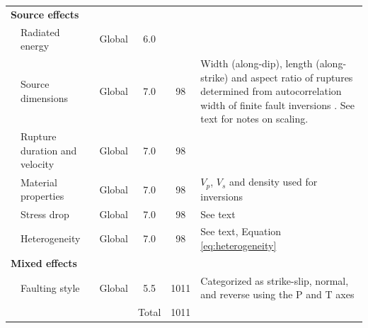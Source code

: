 \documentclass[draft, jgrga]{agujournal2018}
\begin{document}
\begin{table}[]
\begin{threeparttable}
\begin{tabular}{@{}lp{2cm}p{1cm}ccp{6.5cm}@{}}
\multicolumn{2}{l}{\textbf{Source effects}} &              &       &      &                                                                                                                                                                                                            \\
          & Radiated energy\tnote{5}        & Global       & 6.0   &      &                                                                                                                                                                                                            \\
          & Source dimensions\tnote{6}      & Global       & 7.0   & 98   & Width (along-dip), length (along-strike) and aspect ratio of ruptures determined from autocorrelation width of finite fault inversions \citep[following][]{mai2000}. See text for notes on scaling.                                 \\
          & Rupture duration and velocity\tnote{7}& Global  & 7.0   & 98   &                                                                                                                                                                                                            \\
          & Material properties\tnote{7}    & Global       & 7.0   & 98   & $V_p$, $V_s$ and density used for inversions                                                                                                                                                         \\   
          & Stress drop\tnote{6}            & Global       & 7.0   & 98   & See text                                                                                                                                                                                                  \\
          & Heterogeneity\tnote{6}          & Global       & 7.0   & 98   & See text, Equation \ref{eq:heterogeneity}                                                                                                                                                                                                   \\
\multicolumn{2}{l}{\textbf{Mixed effects}}  &              &       &      &                                                                                                                                                                                                            \\
          & Faulting style\tnote{8}         & Global       & 5.5   & 1011 & Categorized as strike-slip, normal, and reverse using the P and T axes                                                                                                                                     \\ \midrule
          &                                 &              & Total & 1011 &                                                
\end{tabular}%


\end{threeparttable}
\end{table}
\end{document}
